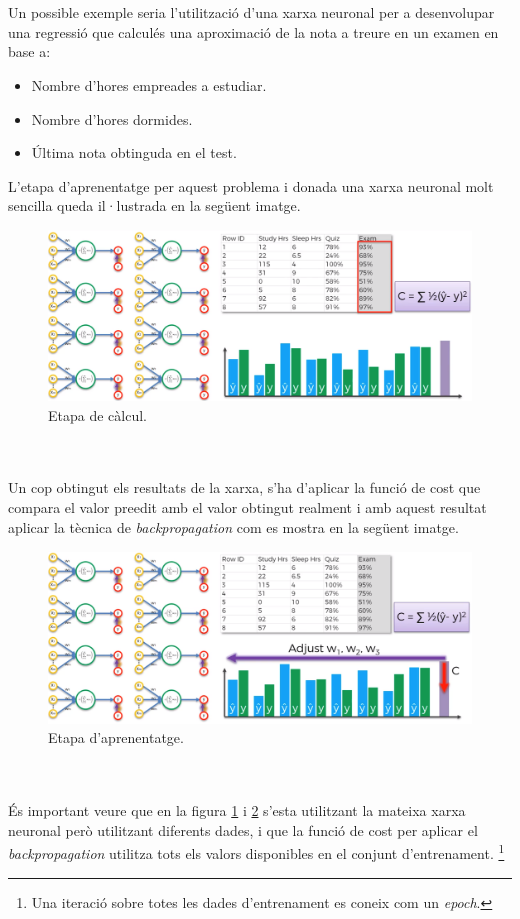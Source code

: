 \documentclass[12pt]{article}
\begin{document}
\\\\Un possible exemple seria l'utilització d'una xarxa neuronal per a desenvolupar una regressió que calculés una aproximació de la nota a treure en un examen en base a:
\begin{itemize}
	\item Nombre d'hores empreades a estudiar.
	\item Nombre d'hores dormides.
	\item Última nota obtinguda en el test.
\end{itemize}
L'etapa d'aprenentatge per aquest problema i donada una xarxa neuronal molt sencilla queda il·lustrada en la següent imatge.
\begin{figure}[h!]
	\centering
	\includegraphics[scale=0.3]{imatges/aprendre/3aprendre.png}
	\caption{Etapa de càlcul.}
	\label{fig:3aprendre}
\end{figure}
\\\\Un cop obtingut els resultats de la xarxa, s'ha d'aplicar la funció de cost que compara el valor preedit amb el valor obtingut realment i amb aquest resultat aplicar la tècnica de \textit{backpropagation} com es mostra en la següent imatge.
\begin{figure}[h!]
	\centering
	\includegraphics[scale=0.3]{imatges/aprendre/4bp.png}
	\caption{Etapa d'aprenentatge.}
	\label{fig:4bp}
\end{figure}
\\\\És important veure que en la figura \ref{fig:3aprendre} i \ref{fig:4bp} s'esta utilitzant la mateixa xarxa neuronal però utilitzant diferents dades, i que la funció de cost per aplicar el \textit{backpropagation} utilitza tots els valors disponibles en el conjunt d'entrenament. \footnote{Una iteració sobre totes les dades d'entrenament es coneix com un \textit{epoch}.}
\end{document}
